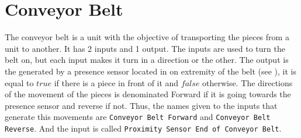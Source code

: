 
\section{Conveyor Belt}
\label{sec:magazine}
The conveyor belt is a unit with the objective of transporting the pieces from a
unit to another. It has 2 inputs and 1 output. The inputs are used to turn the
belt on, but each input makes it turn in a direction or the other. The output is
the generated by a presence sensor located in on extremity of the belt (see
), it is equal to $true$ if there is a piece in front
of it and $false$ otherwise. The directions of the movement of the pieces is
denominated Forward if it is going towards the presence sensor and reverse if
not. Thus, the names given to the inputs that generate this movements are
\verb|Conveyor Belt Forward| and \verb|Conveyor Belt Reverse|.
And the input is called \verb|Proximity Sensor End of Conveyor Belt|.

